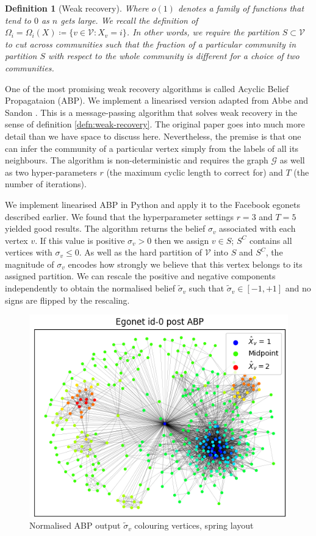\documentclass[11pt]{article}
\newcommand{\Gcal}{\mathcal{G}}
\newcommand{\Vcal}{\mathcal{V}}
\newcommand{\figwidth}{0.7\linewidth}
\newtheorem{definition}{Definition}[section]
\begin{document}
\begin{multicols*}{2}
\begin{definition}[Weak recovery]
	Where $o(1)$ denotes a family of functions that tend to $0$ as $n$ gets large. We recall the definition of $\Omega_i = \Omega_i(X) \coloneqq \{v \in \Vcal : X_v = i\}$. In other words, we require the partition $S \subset \Vcal$ to cut across communities such that the fraction of a particular community in partition $S$ with respect to the whole community is different for a choice of two communities.  
\end{definition}

One of the most promising weak recovery algorithms is called Acyclic Belief Propagataion (ABP). We implement a linearised version adapted from Abbe and Sandon \cite{Linear-ABP}. This is a message-passing algorithm that solves weak recovery in the sense of definition \ref{defn:weak-recovery}. The original paper goes into much more detail than we have space to discuss here. Nevertheless, the premise is that one can infer the community of a particular vertex simply from the labels of all its neighbours. The algorithm is non-deterministic and requires the graph $\Gcal$ as well as two hyper-parameters $r$ (the maximum cyclic length to correct for) and $T$ (the number of iterations).

We implement linearised ABP in Python and apply it to the Facebook egonets described earlier. We found that the hyperparameter settings $r=3$ and $T=5$ yielded good results. The algorithm returns the belief $\sigma_v$ associated with each vertex $v$. If this value is positive $\sigma_v > 0$ then we assign $v \in S$; $S^C$ contains all vertices with $\sigma_v \leq 0$. As well as the hard partition of $\Vcal$ into $S$ and $S^C$, the magnitude of $\sigma_v$ encodes how strongly we believe that this vertex belongs to its assigned partition. We can rescale the positive and negative components independently to obtain the normalised belief $\tilde{\sigma}_v$ such that $\tilde{\sigma}_v \in [-1, +1]$ and no signs are flipped by the rescaling.
%
\begin{figure}[H]
	\centering
	\includegraphics[width=\figwidth]{ego-0-abp.png}
	\caption{Normalised ABP output $\tilde{\sigma}_v$ colouring vertices, spring layout}
	\label{fig:abp-output-norm}
\end{figure}


\end{multicols*}
\end{document}
